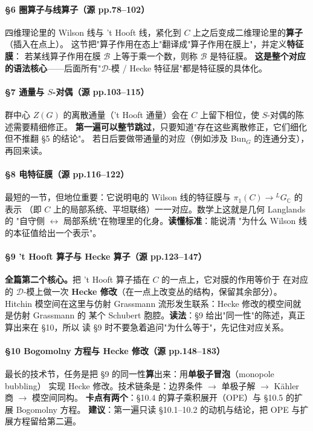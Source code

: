 \documentclass[11pt,a4paper]{article}
\newcommand{\LdualC}{{}^L\!G_{\mathbb{C}}}
\begin{document}
\paragraph{\S6 圈算子与线算子（源 pp.78--102）}
四维理论里的 Wilson 线与 't Hooft 线，紧化到 $C$ 上之后变成二维理论里的\textbf{算子}（插入在点上）。
这节把"算子作用在态上"翻译成"算子作用在膜上"，并定义\textbf{特征膜}：
若某线算子作用在膜 $\mathcal{B}$ 上等于乘一个数，则称 $\mathcal{B}$ 是特征膜。
\textbf{这是整个对应的语法核心}——后面所有"$\mathcal{D}$-模 / Hecke 特征层"都是特征膜的具体化。

\paragraph{\S7 通量与 $S$-对偶（源 pp.103--115）}
群中心 $Z(G)$ 的离散通量（'t Hooft 通量）会在 $C$ 上留下相位，使 $S$-对偶的陈述需要精细修正。
\textbf{第一遍可以整节跳过}，只要知道"存在这些离散修正，它们细化但不推翻 \S5 的结论"。
若日后要做带通量的对应（例如涉及 $\mathrm{Bun}_G$ 的连通分支），再回来读。

\paragraph{\S8 电特征膜（源 pp.116--122）}
最短的一节，但地位重要：它说明电的 Wilson 线的特征膜与 $\pi_1(C)\to\LdualC$ 的表示
（即 $C$ 上的局部系统、平坦联络）一一对应。数学上这就是几何 Langlands 的
"自守侧 $\leftrightarrow$ 局部系统"在物理里的化身。\textbf{读懂标准}：能说清
"为什么 Wilson 线的本征值给出一个表示"。

\paragraph{\S9 't Hooft 算子与 Hecke 算子（源 pp.123--147）}
\textbf{全篇第二个核心。}把 't Hooft 算子插在 $C$ 的一点上，它对膜的作用等价于
在对应的 $\mathcal{D}$-模上做一次 \textbf{Hecke 修改}（在一点上改变丛的结构，保留其余部分）。
Hitchin 模空间在这里与仿射 Grassmann 流形发生联系：Hecke 修改的模空间就是仿射 Grassmann 的
某个 Schubert 胞腔。\textbf{读法}：\S9 给出"同一性"的陈述，真正算出来在 \S10，所以
读 \S9 时不要急着追问"为什么等于"，先记住对应关系。

\paragraph{\S10 Bogomolny 方程与 Hecke 修改（源 pp.148--183）}
最长的技术节，任务是把 \S9 的同一性\textbf{算}出来：用\textbf{单极子冒泡}（monopole bubbling）
实现 Hecke 修改。技术链条是：边界条件 $\to$ 单极子解 $\to$ Kähler 商 $\to$ 模空间同构。
\textbf{卡点有两个}：\S10.4 的算子乘积展开（OPE）与 \S10.5 的扩展 Bogomolny 方程。
\textbf{建议}：第一遍只读 \S10.1--10.2 的动机与结论，把 OPE 与扩展方程留给第二遍。
\end{document}
